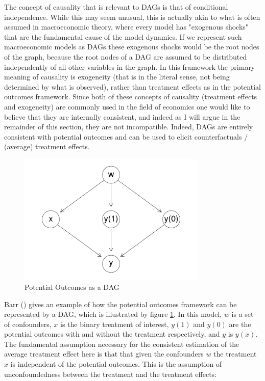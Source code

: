 \documentclass{article}
\begin{document}
The concept of causality that is relevant to DAGs is that of conditional independence. While this may seem unusual, this is actually akin to what is often assumed in macroeconomic theory, where every model has "exogenous shocks" that are the fundamental cause of the model dynamics. If we represent such macroeconomic models as DAGs these exogenous shocks would be the root nodes of the graph, because the root nodes of a DAG are assumed to be distributed independently of all other variables in the graph. In this framework the primary meaning of causality is exogeneity (that is in the literal sense, not being determined by what is observed), rather than treatment effects as in the potential outcomes framework. Since both of these concepts of causality (treatment effects and exogeneity) are commonly used in the field of economics one would like to believe that they are internally consistent, and indeed as I will argue in the remainder of this section, they are not incompatible. Indeed, DAGs are entirely consistent with potential outcomes and can be used to elicit counterfactuals / (average) treatment effects.

\begin{figure}
  \centering
  \includegraphics[width=0.8\textwidth]{images/potential_outcomes_dag.png}
  \caption{Potential Outcomes as a DAG}
  \label{dag6}
\end{figure}

Barr (\citeyear{barr2018causal}) gives an example of how the potential outcomes framework can be represented by a DAG, which is illustrated by figure \ref{dag6}. In this model, $w$ is a set of confounders, $x$ is the binary treatment of interest, $y(1)$ and $y(0)$ are the potential outcomes with and without the treatment respectively, and $y$ is $y(x)$. The fundamental assumption necessary for the consistent estimation of the average treatment effect here is that that given the confounders $w$ the treatment $x$ is independent of the potential outcomes. This is the assumption of unconfoundedness between the treatment and the treatment effects:
 
\end{document}
